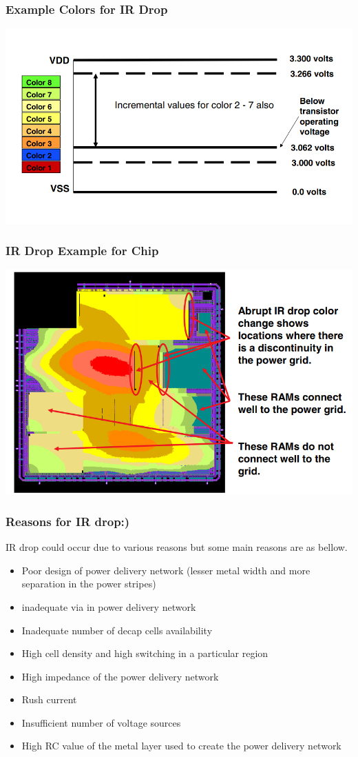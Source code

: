 \documentclass{beamer}
\begin{document}
	\begin{frame}
		\frametitle{Example Colors for IR Drop}
			\begin{center}
				\includegraphics[width=\textwidth]{IR5}
			\end{center}
	\end{frame}	
		\begin{frame}
		\frametitle{IR Drop Example for Chip}
		\begin{center}
			\includegraphics[width=\textwidth]{IR6}
		\end{center}
	\end{frame}	
	\begin{frame}
		\frametitle{Reasons for IR drop:)}
		IR drop could occur due to various reasons but some main reasons are as bellow.
		\begin{itemize}
			\item Poor design of power delivery network (lesser metal width and more separation in the power stripes)
			\item inadequate via in power delivery network 
			\item Inadequate number of decap cells availability
			\item High cell density and high switching in a particular region
			\item High impedance of the power delivery network
			\item Rush current 
			\item Insufficient number of voltage sources 
			\item High RC value of the metal layer used to create the power delivery network
		\end{itemize}
	\end{frame}
	
\end{document}
